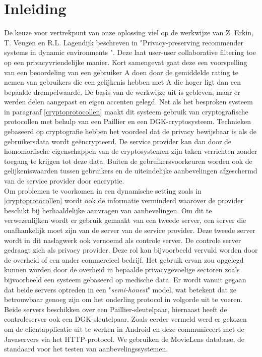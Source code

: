 
\section{Inleiding}
De keuze voor vertrekpunt van onze oplossing viel op de werkwijze van Z. Erkin, T. Veugen en R.L. Lagendijk beschreven in "Privacy-preserving recommender systems in dynamic environments \cite{ZErkinDyn}". Deze laat user-user collaborative filtering toe op een privacyvriendelijke manier. Kort samengevat gaat deze een voorspelling van een beoordeling van een gebruiker A doen door de gemiddelde rating te nemen van gebruikers die een gelijkenis hebben met A die hoger ligt dan een bepaalde drempelwaarde. De basis van de werkwijze uit \cite{ZErkinDyn} is gebleven, maar er werden delen aangepast en eigen accenten gelegd. Net als het besproken systeem in paragraaf \ref{cryptoprotocollen} maakt dit systeem gebruik van cryptografische protocollen met behulp van een Paillier en een DGK-cryptosysteem. Technieken gebaseerd op cryptografie hebben het voordeel dat de privacy bewijsbaar is als de gebruikersdata wordt ge\"encrypteerd. De service provider kan dan door de homomorfische eigenschappen van de cryptosystemen zijn taken verrichten zonder toegang te krijgen tot deze data. Buiten de gebruikersvoorkeuren worden ook de gelijkeniswaarden tussen gebruikers en de uiteindelijke aanbevelingen afgeschermd van de service provider door encryptie.\\ Om problemen te voorkomen in een dynamische setting zoals in \ref{cryptoprotocollen} wordt ook de informatie verminderd waarover de provider beschikt bij herhaaldelijke aanvragen van aanbevelingen. Om dit te verwezenlijken wordt er gebruik gemaakt van een tweede server, een server die onafhankelijk moet zijn van de server van de service provider. Deze tweede server wordt in dit naslagwerk ook vernoemd als controle server. De controle server gedraagt zich als privacy provider. Deze rol kan bijvoorbeeld vervuld worden door de overheid of een ander commercieel bedrijf. Het gebruik ervan zou opgelegd kunnen worden door de overheid in bepaalde privacygevoelige sectoren zoals bijvoorbeeld een systeem gebaseerd op medische data. Er wordt vanuit gegaan dat beide servers optreden in een "\emph{semi-honest}" model, wat betekent dat ze betrouwbaar genoeg zijn om het onderling protocol in volgorde uit te voeren. \\ Beide servers beschikken over een Paillier-sleutelpaar, hiernaast heeft de controleserver ook een DGK-sleutelpaar. Zoals eerder vermeld werd er gekozen om de clientapplicatie uit te werken in Android en deze communiceert met de Javaservers via het HTTP-protocol. We gebruiken de MovieLens database, de standaard voor het testen van aanbevelingssystemen.